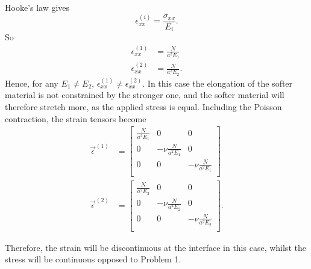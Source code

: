 \begin{derivation}
    Hooke's law gives
    \begin{equation*}
      \epsilon_{x x}^{(i)} = \frac{\sigma_{x x}}{E_i}
    .\end{equation*}
    So
    \begin{align}
      \epsilon_{x x}^{(1)} &= \frac{N}{a^2 E_1} \label{eq:32strx1}\\
      \epsilon_{x x }^{(2)} &= \frac{N}{a^2 E_2} \label{eq:32strx2}
    .\end{align}
    Hence, for any $E_1 \neq E_2$, $\epsilon_{x x}^{(1)} \neq  \epsilon_{x x}^{(2)}$.
    In this case the elongation of the softer material is not constrained by the stronger one, and the softer material will therefore stretch more, as the applied stress is equal.
    Including the Poisson contraction, the strain tensors become
    \begin{align*}
      \Vec{\epsilon}^{(1)} &= \begin{bmatrix}
        \frac{N}{a^2 E_1} & 0 & 0\\
      0 &  - \nu \frac{N}{a^2 E_1} & 0\\
      0 & 0 & - \nu \frac{N}{a^2 E_1}\\
      \end{bmatrix} \\
        \Vec{\epsilon}^{(2)} &= \begin{bmatrix}
          \frac{N}{a^2 E_2} & 0 & 0\\
        0 & - \nu \frac{N}{a^2 E_2} & 0\\
        0 & 0 & - \nu \frac{N}{a^2 E_2}\\
        \end{bmatrix}
    .\end{align*}

    Therefore, the strain will be discontinuous at the interface in this case, whilst the stress will be continuous opposed to Problem 1.
  \end{derivation}

